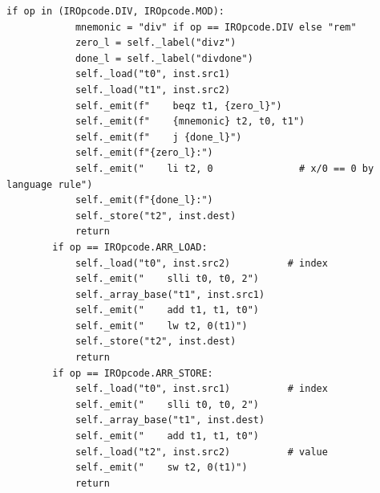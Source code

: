 \begin{lstlisting}[style=snippet]
        if op in (IROpcode.DIV, IROpcode.MOD):
            mnemonic = "div" if op == IROpcode.DIV else "rem"
            zero_l = self._label("divz")
            done_l = self._label("divdone")
            self._load("t0", inst.src1)
            self._load("t1", inst.src2)
            self._emit(f"    beqz t1, {zero_l}")
            self._emit(f"    {mnemonic} t2, t0, t1")
            self._emit(f"    j {done_l}")
            self._emit(f"{zero_l}:")
            self._emit("    li t2, 0               # x/0 == 0 by language rule")
            self._emit(f"{done_l}:")
            self._store("t2", inst.dest)
            return
        if op == IROpcode.ARR_LOAD:
            self._load("t0", inst.src2)          # index
            self._emit("    slli t0, t0, 2")
            self._array_base("t1", inst.src1)
            self._emit("    add t1, t1, t0")
            self._emit("    lw t2, 0(t1)")
            self._store("t2", inst.dest)
            return
        if op == IROpcode.ARR_STORE:
            self._load("t0", inst.src1)          # index
            self._emit("    slli t0, t0, 2")
            self._array_base("t1", inst.dest)
            self._emit("    add t1, t1, t0")
            self._load("t2", inst.src2)          # value
            self._emit("    sw t2, 0(t1)")
            return
\end{lstlisting}
